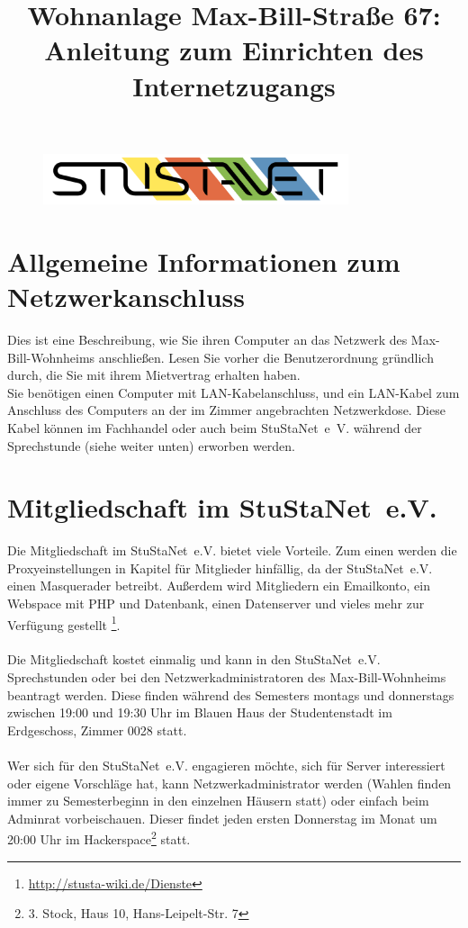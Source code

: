 \documentclass[a4paper,12pt]{scrartcl}
\title{Wohnanlage Max-Bill-Straße 67:\\
       Anleitung zum Einrichten des Internetzugangs}
\begin{document}
\maketitle

\begin{figure}[t!]
   \centering
   \vspace{-20pt}
   \includegraphics[width=0.8\textwidth,keepaspectratio]{Bilder/StuStaNet_Logo}
   \vspace{-40pt}
\end{figure}

\section*{Allgemeine Informationen zum Netzwerkanschluss}

Dies ist eine Beschreibung, wie Sie ihren Computer an das Netzwerk des Max-Bill-Wohnheims anschließen. Lesen Sie vorher die Benutzerordnung gründlich durch, die Sie mit ihrem Mietvertrag erhalten haben.
\\Sie benötigen einen Computer mit LAN-Kabelanschluss, und ein LAN-Kabel zum Anschluss des Computers an der im Zimmer angebrachten Netzwerkdose. Diese Kabel können im Fachhandel oder auch beim StuStaNet~e~V. während der Sprechstunde (siehe weiter unten) erworben werden.

\section*{Mitgliedschaft im StuStaNet~e.V.}

Die Mitgliedschaft im StuStaNet~e.V. bietet viele Vorteile. Zum einen werden die Proxyeinstellungen in Kapitel \emph{} für Mitglieder hinfällig, da der StuStaNet~e.V. einen Masquerader betreibt. Außerdem wird Mitgliedern ein Emailkonto, ein Webspace mit PHP und Datenbank, einen Datenserver und vieles mehr  zur Verfügung gestellt \footnote{\url{http://stusta-wiki.de/Dienste}}.
\\
\\Die Mitgliedschaft kostet einmalig  und kann in den StuStaNet~e.V. Sprechstunden oder bei den Netzwerkadministratoren des Max-Bill-Wohnheims beantragt werden. Diese finden während des Semesters montags und donnerstags zwischen 19:00 und 19:30 Uhr im Blauen Haus der Studentenstadt im Erdgeschoss, Zimmer 0028 statt.
\\
\\Wer sich für den StuStaNet~e.V. engagieren möchte, sich für Server interessiert oder eigene Vorschläge hat, kann Netzwerkadministrator werden (Wahlen finden immer zu Semesterbeginn in den einzelnen Häusern statt) oder einfach beim Adminrat vorbeischauen. Dieser findet jeden ersten Donnerstag im Monat um 20:00 Uhr im Hackerspace\footnote{3. Stock, Haus 10, Hans-Leipelt-Str. 7} statt.
\end{document}
